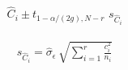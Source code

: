 \documentclass[12pt]{article}
\begin{document}
\pagestyle{empty}
\Large
{}
\pagecolor{ehandbook}

\boldmath

\begin{eqnarray*}
\hat{C}_{i} \pm t_{1-\alpha/(2g), N-r} \,\, s_{\hat{C}_i}
\end{eqnarray*}

\vspace*{.25in}

\begin{eqnarray*}
s_{\hat{C}_i} = \hat{\sigma}_\epsilon \, \sqrt{\sum^{r}_{i=1} \frac{c^2_i}{n_i}}
\end{eqnarray*}
\end{document}
